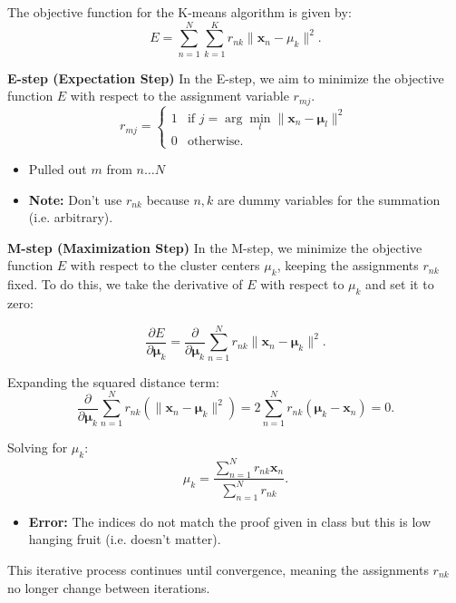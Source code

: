 \begin{derivation}
    The objective function for the K-means algorithm is given by:
    \[
    E = \sum_{n=1}^{N} \sum_{k=1}^{K} r_{nk} \| \mathbf{x}_n - \mu_k \|^2.
    \]
    \vspace{1em}

    \textbf{E-step (Expectation Step)} In the E-step, we aim to minimize the objective function \( E \) with respect to the assignment variable \( r_{mj} \).
    \[
    r_{mj} = 
    \begin{cases} 
    1 & \text{if } j = \arg \min_l \| \mathbf{x}_n - \mathbf{\mu}_l \|^2 \\
    0 & \text{otherwise.}
    \end{cases}
    \]
    \begin{itemize}
        \item Pulled out $m$ from $n\ldots N$
        \item \textbf{Note:} Don't use $r_{nk}$ because $n,k$ are dummy variables for the summation (i.e. arbitrary).
    \end{itemize}
    \vspace{1em}

    \textbf{M-step (Maximization Step)}
    In the M-step, we minimize the objective function \( E \) with respect to the cluster centers \( \mu_k \), keeping the assignments \( r_{nk} \) fixed. To do this, we take the derivative of \( E \) with respect to \( \mu_k \) and set it to zero:

    \[
    \frac{\partial E}{\partial \mathbf{\mu}_k} = \frac{\partial}{\partial \mathbf{\mu}_k} \sum_{n=1}^{N} r_{nk} \| \mathbf{x}_n - \mathbf{\mu}_k \|^2.
    \]

    Expanding the squared distance term:
    \[
    \frac{\partial}{\partial \mathbf{\mu}_k} \sum_{n=1}^{N} r_{nk} \left( \| \mathbf{x}_n - \mathbf{\mu}_k \|^2 \right) = 2 \sum_{n=1}^{N} r_{nk} (\mathbf{\mu}_k - \mathbf{x}_n) = 0.
    \]

    Solving for \( \mu_k \):
    \[
    \mu_k = \frac{\sum_{n=1}^{N} r_{nk} \mathbf{x}_n}{\sum_{n=1}^{N} r_{nk}}.
    \]
    \begin{itemize}
        \item \textbf{Error:} The indices do not match the proof given in class but this is low hanging fruit (i.e. doesn't matter).
    \end{itemize}
    \vspace{1em}

    This iterative process continues until convergence, meaning the assignments \( r_{nk} \) no longer change between iterations.

\end{derivation}

